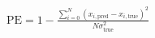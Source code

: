 \begin{align}
  \text{PE} = 1 - \frac{\sum_{i=0}^N \left(x_{i,\text{pred}} - x_{i,\text{true}} \right)^2}{N \sigma^2_\text{true}} 
\end{align}
